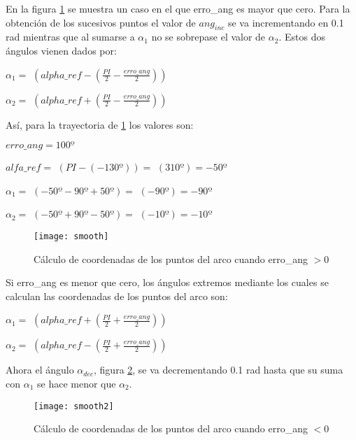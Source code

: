 En la figura \ref{fg:smooth} se muestra un caso en el que erro\_ang es mayor que cero. Para la obtención de los sucesivos puntos el valor de $ang_{inc}$ se va incrementando en 0.1 rad mientras que al sumarse a $\alpha_{1}$ no se sobrepase el valor de $\alpha_{2}$. Estos dos ángulos vienen dados por:

\begin{center}
$\alpha_{1} =$ $(alpha\_ref - (\frac{PI}{2} - \frac{erro\_ang}{2}))$
\end{center}

\begin{center}
$\alpha_{2} =$ $(alpha\_ref + (\frac{PI}{2} - \frac{erro\_ang}{2}))$
\end{center}

Así, para la trayectoria de \ref{fg:smooth} los valores son:
\vspace{0.5cm}

$erro\_ang = 100º$

$alfa\_ref =$ $(PI - (-130º)) =$ $(310º) = -50º$

$\alpha_{1} =$ $(-50º - 90º + 50º) =$ $(-90º) = -90º$

$\alpha_{2} =$ $(-50º + 90º -50º) =$ $(-10º) = -10º$


\begin{figure}[h]
  \centering\texttt{[image: smooth]}\\
  \caption{Cálculo de coordenadas de los puntos del arco cuando erro\_ang $> 0$}\label{fg:smooth}
\end{figure}

Si erro\_ang es menor que cero, los ángulos extremos mediante los cuales se calculan las coordenadas de los puntos del arco son:

\begin{center}
$\alpha_{1} =$ $(alpha\_ref + (\frac{PI}{2} + \frac{erro\_ang}{2}))$
\end{center}

\begin{center}
$\alpha_{2} =$ $(alpha\_ref - (\frac{PI}{2} + \frac{erro\_ang}{2}))$
\end{center}

Ahora el ángulo $\alpha_{dec}$, figura \ref{fg:smooth2}, se va decrementando 0.1 rad hasta que su suma con $\alpha_{1}$ se hace menor que $\alpha_{2}$.

\begin{figure}[h]
  \centering\texttt{[image: smooth2]}\\
  \caption{Cálculo de coordenadas de los puntos del arco cuando erro\_ang $< 0$}\label{fg:smooth2}
\end{figure}

